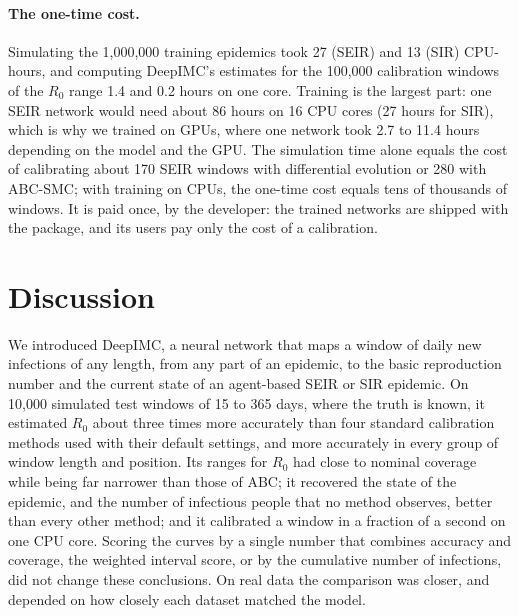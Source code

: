 \documentclass[12pt]{article}
\begin{document}
\paragraph{The one-time cost.} Simulating the 1,000,000 training epidemics took 27 (SEIR) and 13 (SIR)
CPU-hours, and computing DeepIMC's estimates for the 100,000 calibration windows of the $R_0$ range 1.4 and
0.2 hours on one core. Training is the largest part: one SEIR network would need about 86 hours on 16 CPU
cores (27 hours for SIR), which is why we trained on GPUs, where one network took 2.7 to 11.4 hours depending
on the model and the GPU. The simulation time alone equals the cost of calibrating about 170 SEIR windows with
differential evolution or 280 with ABC-SMC; with training on CPUs, the one-time cost equals tens of
thousands of windows. It is paid once, by the developer: the trained networks are shipped with the
package, and its users pay only the cost of a calibration.

\begin{table}[htbp]
\centering
\caption{Computing time on CPUs (one core per method, the same computer for all methods), and the
one-time cost of DeepIMC.}
\label{tab:timing}
\small

\end{table}

\section{Discussion}\label{sec:discussion}

We introduced DeepIMC, a neural network that maps a window of daily new infections of any length, from
any part of an epidemic, to the basic reproduction number and the current state of an agent-based SEIR or
SIR epidemic. On 10,000 simulated test windows of 15 to 365 days, where the truth is known, it estimated
$R_0$ about three times more accurately than four standard calibration methods used with their default
settings, and more accurately in every group of window length and position. Its ranges
for $R_0$ had close to nominal coverage while being far narrower than those of ABC; it recovered the state of
the epidemic, and the number of infectious people that no method observes, better than every other method;
and it calibrated a window in a fraction of a second on one CPU core. Scoring the curves by a single number
that combines accuracy and coverage, the weighted interval score, or by the cumulative number of infections,
did not change these conclusions. On real data the comparison was closer, and depended on how closely each
dataset matched the model.
\end{document}

